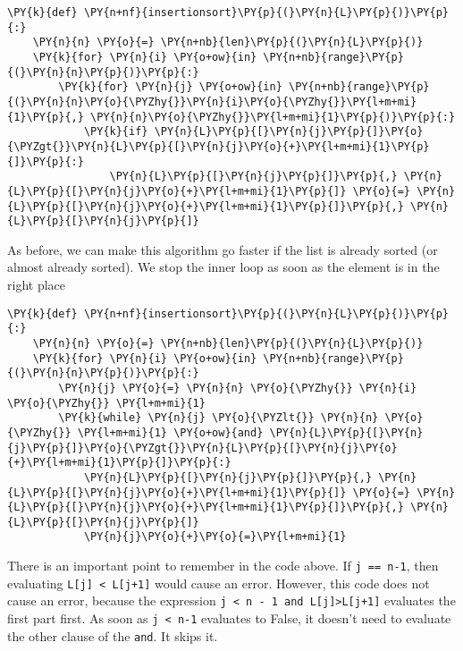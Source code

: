 \begin{Verbatim}[commandchars=\\\{\}]
\PY{k}{def} \PY{n+nf}{insertionsort}\PY{p}{(}\PY{n}{L}\PY{p}{)}\PY{p}{:}
    \PY{n}{n} \PY{o}{=} \PY{n+nb}{len}\PY{p}{(}\PY{n}{L}\PY{p}{)}
    \PY{k}{for} \PY{n}{i} \PY{o+ow}{in} \PY{n+nb}{range}\PY{p}{(}\PY{n}{n}\PY{p}{)}\PY{p}{:}
        \PY{k}{for} \PY{n}{j} \PY{o+ow}{in} \PY{n+nb}{range}\PY{p}{(}\PY{n}{n}\PY{o}{\PYZhy{}}\PY{n}{i}\PY{o}{\PYZhy{}}\PY{l+m+mi}{1}\PY{p}{,} \PY{n}{n}\PY{o}{\PYZhy{}}\PY{l+m+mi}{1}\PY{p}{)}\PY{p}{:}
            \PY{k}{if} \PY{n}{L}\PY{p}{[}\PY{n}{j}\PY{p}{]}\PY{o}{\PYZgt{}}\PY{n}{L}\PY{p}{[}\PY{n}{j}\PY{o}{+}\PY{l+m+mi}{1}\PY{p}{]}\PY{p}{:}
                \PY{n}{L}\PY{p}{[}\PY{n}{j}\PY{p}{]}\PY{p}{,} \PY{n}{L}\PY{p}{[}\PY{n}{j}\PY{o}{+}\PY{l+m+mi}{1}\PY{p}{]} \PY{o}{=} \PY{n}{L}\PY{p}{[}\PY{n}{j}\PY{o}{+}\PY{l+m+mi}{1}\PY{p}{]}\PY{p}{,} \PY{n}{L}\PY{p}{[}\PY{n}{j}\PY{p}{]}
\end{Verbatim}



As before, we can make this algorithm go faster if the list is already sorted (or almost already sorted).  We stop the inner loop as soon as the element is in the right place

\begin{Verbatim}[commandchars=\\\{\}]
\PY{k}{def} \PY{n+nf}{insertionsort}\PY{p}{(}\PY{n}{L}\PY{p}{)}\PY{p}{:}
    \PY{n}{n} \PY{o}{=} \PY{n+nb}{len}\PY{p}{(}\PY{n}{L}\PY{p}{)}
    \PY{k}{for} \PY{n}{i} \PY{o+ow}{in} \PY{n+nb}{range}\PY{p}{(}\PY{n}{n}\PY{p}{)}\PY{p}{:}
        \PY{n}{j} \PY{o}{=} \PY{n}{n} \PY{o}{\PYZhy{}} \PY{n}{i} \PY{o}{\PYZhy{}} \PY{l+m+mi}{1}
        \PY{k}{while} \PY{n}{j} \PY{o}{\PYZlt{}} \PY{n}{n} \PY{o}{\PYZhy{}} \PY{l+m+mi}{1} \PY{o+ow}{and} \PY{n}{L}\PY{p}{[}\PY{n}{j}\PY{p}{]}\PY{o}{\PYZgt{}}\PY{n}{L}\PY{p}{[}\PY{n}{j}\PY{o}{+}\PY{l+m+mi}{1}\PY{p}{]}\PY{p}{:}
            \PY{n}{L}\PY{p}{[}\PY{n}{j}\PY{p}{]}\PY{p}{,} \PY{n}{L}\PY{p}{[}\PY{n}{j}\PY{o}{+}\PY{l+m+mi}{1}\PY{p}{]} \PY{o}{=} \PY{n}{L}\PY{p}{[}\PY{n}{j}\PY{o}{+}\PY{l+m+mi}{1}\PY{p}{]}\PY{p}{,} \PY{n}{L}\PY{p}{[}\PY{n}{j}\PY{p}{]}
            \PY{n}{j}\PY{o}{+}\PY{o}{=}\PY{l+m+mi}{1}
\end{Verbatim}



There is an important point to remember in the code above.  If \texttt{j == n-1}, then evaluating \texttt{L[j] < L[j+1]} would cause an error.  However, this code does not cause an error, because the expression \texttt{j < n - 1 and L[j]>L[j+1]} evaluates the first part first.  As soon as \texttt{j < n-1} evaluates to False, it doesn't need to evaluate the other clause of the \texttt{and}.  It skips it.


